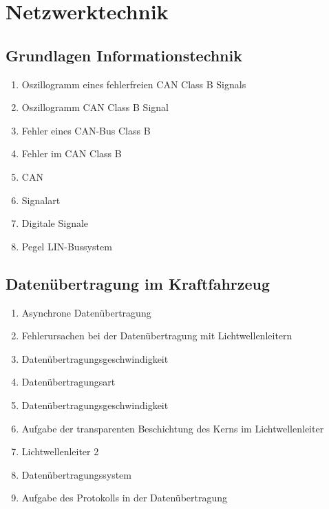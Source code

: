 \section{Netzwerktechnik}\label{netzwerktechnik}

\subsection{Grundlagen
Informationstechnik}\label{grundlagen-informationstechnik}

\begin{enumerate}
\item
  Oszillogramm eines fehlerfreien CAN Class B Signals\\
\item
  Oszillogramm CAN Class B Signal\\
\item
  Fehler eines CAN-Bus Class B\\
\item
  Fehler im CAN Class B\\
\item
  CAN\\
\item
  Signalart\\
\item
  Digitale Signale\\
\item
  Pegel LIN-Bussystem
\end{enumerate}

\subsection{Datenübertragung im
Kraftfahrzeug}\label{datenuebertragung-im-kraftfahrzeug}

\begin{enumerate}
\item
  Asynchrone Datenübertragung\\
\item
  Fehlerursachen bei der Datenübertragung mit Lichtwellenleitern\\
\item
  Datenübertragungsgeschwindigkeit\\
\item
  Datenübertragungsart\\
\item
  Datenübertragungsgeschwindigkeit\\
\item
  Aufgabe der transparenten Beschichtung des Kerns im
  Lichtwellenleiter\\
\item
  Lichtwellenleiter 2
\item
  Datenübertragungssystem\\
\item
  Aufgabe des Protokolls in der Datenübertragung
\end{enumerate}

